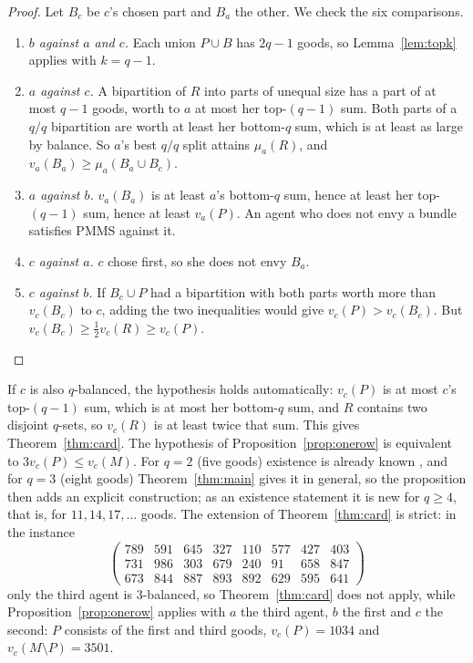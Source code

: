 \documentclass[11pt,a4paper]{article}
\theoremstyle{remark}
\newcommand{\mms}{\mu}
\begin{document}
\begin{proof}
Let $B_c$ be $c$'s chosen part and $B_a$ the other. We check the six comparisons.
\begin{enumerate}[label=(\roman*)]
\item \emph{$b$ against $a$ and $c$.} Each union $P\cup B$ has $2q-1$ goods, so Lemma~\ref{lem:topk} applies with $k=q-1$.
\item \emph{$a$ against $c$.} A bipartition of $R$ into parts of unequal size has a part of at most $q-1$ goods, worth to $a$ at most her top-$(q-1)$ sum. Both parts of a $q/q$ bipartition are worth at least her bottom-$q$ sum, which is at least as large by balance. So $a$'s best $q/q$ split attains $\mms_a(R)$, and $v_a(B_a)\ge\mms_a(B_a\cup B_c)$.
\item \emph{$a$ against $b$.} $v_a(B_a)$ is at least $a$'s bottom-$q$ sum, hence at least her top-$(q-1)$ sum, hence at least $v_a(P)$. An agent who does not envy a bundle satisfies PMMS against it.
\item \emph{$c$ against $a$.} $c$ chose first, so she does not envy $B_a$.
\item \emph{$c$ against $b$.} If $B_c\cup P$ had a bipartition with both parts worth more than $v_c(B_c)$ to $c$, adding the two inequalities would give $v_c(P)>v_c(B_c)$. But $v_c(B_c)\ge \tfrac12 v_c(R)\ge v_c(P)$. \qedhere
\end{enumerate}
\end{proof}

If $c$ is also $q$-balanced, the hypothesis holds automatically: $v_c(P)$ is at most $c$'s top-$(q-1)$ sum, which is at most her bottom-$q$ sum, and $R$ contains two disjoint $q$-sets, so $v_c(R)$ is at least twice that sum. This gives Theorem~\ref{thm:card}. The hypothesis of Proposition~\ref{prop:onerow} is equivalent to $3v_c(P)\le v_c(M)$. For $q=2$ (five goods) existence is already known \cite{AMN20}, and for $q=3$ (eight goods) Theorem~\ref{thm:main} gives it in general, so the proposition then adds an explicit construction; as an existence statement it is new for $q\ge4$, that is, for $11, 14, 17,\dots$ goods. The extension of Theorem~\ref{thm:card} is strict: in the instance
\[\begin{pmatrix}789&591&645&327&110&577&427&403\\731&986&303&679&240&91&658&847\\673&844&887&893&892&629&595&641\end{pmatrix}\]
only the third agent is $3$-balanced, so Theorem~\ref{thm:card} does not apply, while Proposition~\ref{prop:onerow} applies with $a$ the third agent, $b$ the first and $c$ the second: $P$ consists of the first and third goods, $v_c(P)=1034$ and $v_c(M\setminus P)=3501$.
\end{document}
